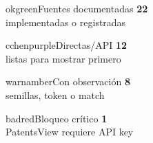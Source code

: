 \documentclass[9pt,a4paper]{extarticle}
\begin{document}
\vspace{0.02cm}
\begin{minipage}{0.24\textwidth}
\begin{metricbox}{okgreen}{Fuentes documentadas}
{\LARGE\bfseries 22}\\[-2pt]
{\tiny implementadas o registradas}
\end{metricbox}
\end{minipage}\hfill
\begin{minipage}{0.24\textwidth}
\begin{metricbox}{cchenpurple}{Directas/API}
{\LARGE\bfseries 12}\\[-2pt]
{\tiny listas para mostrar primero}
\end{metricbox}
\end{minipage}\hfill
\begin{minipage}{0.24\textwidth}
\begin{metricbox}{warnamber}{Con observación}
{\LARGE\bfseries 8}\\[-2pt]
{\tiny semillas, token o match}
\end{metricbox}
\end{minipage}\hfill
\begin{minipage}{0.24\textwidth}
\begin{metricbox}{badred}{Bloqueo crítico}
{\LARGE\bfseries 1}\\[-2pt]
{\tiny PatentsView requiere API key}
\end{metricbox}
\end{minipage}
\end{document}
